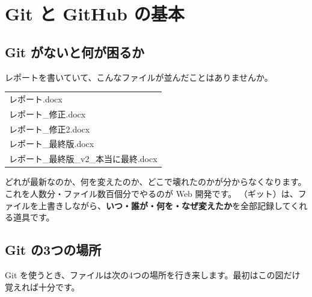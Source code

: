 \chapter{Git と GitHub の基本}

\section{Git がないと何が困るか}

レポートを書いていて、こんなファイルが並んだことはありませんか。

\begin{center}\ttfamily\small
\begin{tabular}{l}
レポート.docx\\
レポート\_修正.docx\\
レポート\_修正2.docx\\
レポート\_最終版.docx\\
レポート\_最終版\_v2\_本当に最終.docx
\end{tabular}
\end{center}

どれが最新なのか、何を変えたのか、どこで壊れたのかが分からなくなります。
これを人数分・ファイル数百個分でやるのが Web 開発です。
（ギット）は、ファイルを上書きしながら、\textbf{いつ・誰が・何を・なぜ変えたか}を全部記録してくれる道具です。

\section{Git の3つの場所}

Git を使うとき、ファイルは次の4つの場所を行き来します。最初はこの図だけ覚えれば十分です。

